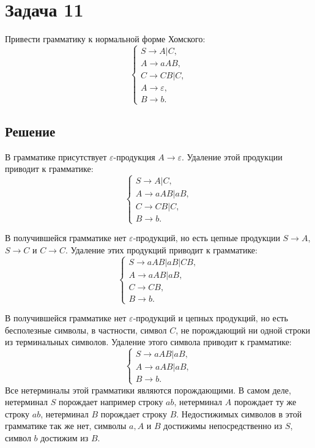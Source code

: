 \documentclass[11pt]{article}
\begin{document}
\section{Задача 11}
\label{sec:org94191c7}
Привести грамматику к нормальной форме Хомского:
\begin{equation}
\begin{cases}
S \rightarrow A | C, \\
A \rightarrow aAB, \\
C \rightarrow CB | C, \\
A \rightarrow \varepsilon, \\
B \rightarrow b.
\end{cases}
\end{equation}
\subsection{Решение}
\label{sec:org96af275}
В грамматике присутствует \(\varepsilon\)-продукция \(A \rightarrow \varepsilon\). Удаление этой
продукции приводит к грамматике:
\begin{equation}
\begin{cases}
S \rightarrow A | C, \\
A \rightarrow aAB | aB, \\
C \rightarrow CB | C, \\
B \rightarrow b.
\end{cases}
\end{equation}

В получившейся грамматике нет \(\varepsilon\)-продукций, но есть цепные продукции \(S \rightarrow A\),
\(S \rightarrow C\) и \(C \rightarrow C\). Удаление этих продукций приводит к грамматике:
\begin{equation}
\begin{cases}
S \rightarrow aAB | aB | CB, \\
A \rightarrow aAB | aB, \\
C \rightarrow CB, \\
B \rightarrow b.
\end{cases}
\end{equation}

В получившейся грамматике нет \(\varepsilon\)-продукций и цепных продукций, но есть бесполезные
символы, в частности, символ \(C\), не порождающий ни одной строки из терминальных символов.
Удаление этого символа приводит к грамматике:
\begin{equation}
\begin{cases}
S \rightarrow aAB | aB, \\
A \rightarrow aAB | aB, \\
B \rightarrow b.
\end{cases}
\end{equation}
Все нетерминалы этой грамматики являются порождающими. В самом деле, нетерминал \(S\) порождает
например строку \(ab\), нетерминал \(A\) порождает ту же строку \(ab\), нетерминал \(B\) порождает
строку \(B\). Недостижимых символов в этой грамматике так же нет, символы \(a, A\) и \(B\) достижимы
непосредственно из \(S\), символ \(b\) достижим из \(B\).
\end{document}
